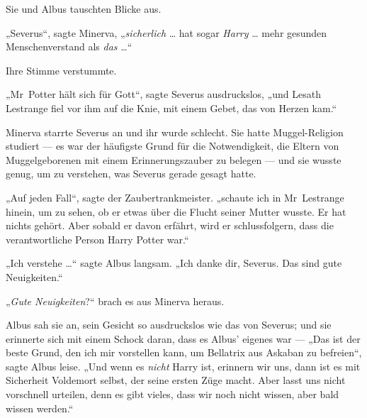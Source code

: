 Sie und Albus tauschten Blicke aus.

„Severus“, sagte Minerva,
„\emph{sicherlich} … hat sogar \emph{Harry} … mehr gesunden Menschenverstand als \emph{das} …“

Ihre Stimme verstummte.

„Mr~Potter hält sich für Gott“, sagte Severus ausdruckslos, „und Lesath Lestrange fiel vor ihm auf die Knie, mit einem Gebet, das von Herzen kam.“

Minerva starrte Severus an und ihr wurde schlecht. Sie hatte Muggel-Religion studiert — es war der häufigste Grund für die Notwendigkeit, die Eltern von Muggelgeborenen mit einem Erinnerungszauber zu belegen — und sie wusste genug, um zu verstehen, was Severus gerade gesagt hatte.

„Auf jeden Fall“, sagte der Zaubertrankmeister. „schaute ich in Mr~Lestrange hinein, um zu sehen, ob er etwas über die Flucht seiner Mutter wusste. Er hat nichts gehört. Aber sobald er davon erfährt, wird er schlussfolgern, dass die verantwortliche Person Harry Potter war.“

„Ich verstehe …“ sagte Albus langsam.
„Ich danke dir, Severus. Das sind gute Neuigkeiten.“

„\emph{Gute Neuigkeiten}?“ brach es aus Minerva heraus.

Albus sah sie an, sein Gesicht so ausdruckslos wie das von Severus; und sie erinnerte sich mit einem Schock daran, dass es Albus’ eigenes war —
„Das ist der beste Grund, den ich mir vorstellen kann, um Bellatrix aus Askaban zu befreien“, sagte Albus leise.
„Und wenn es \emph{nicht} Harry ist, erinnern wir uns, dann ist es mit Sicherheit Voldemort selbst, der seine ersten Züge macht. Aber lasst uns nicht vorschnell urteilen, denn es gibt vieles, dass wir noch nicht wissen, aber bald wissen werden.“

